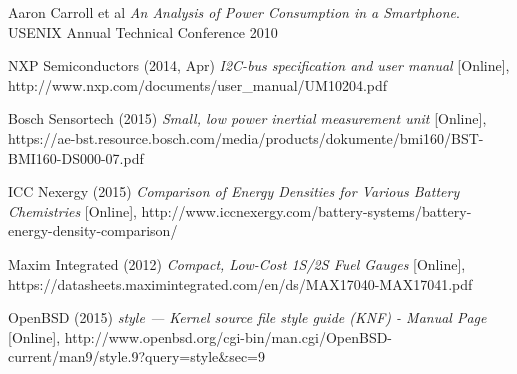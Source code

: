 \documentclass[12pt,openany,a4paper]{book}
\begin{document}
\begin{thebibliography}{99}
	Aaron Carroll et al \emph{An Analysis of Power Consumption in a Smartphone}.
	USENIX Annual Technical Conference 2010
	
	NXP Semiconductors (2014, Apr)
	\emph{I2C-bus specification and user manual} [Online],
	http://www.nxp.com/documents/user\_manual/UM10204.pdf
	
	Bosch Sensortech (2015)
	\emph{Small, low power inertial measurement unit} [Online], https://ae-bst.resource.bosch.com/media/products/dokumente/bmi160/BST-BMI160-DS000-07.pdf
	
	ICC Nexergy (2015)
	\emph{Comparison of Energy Densities for Various Battery Chemistries} [Online], http://www.iccnexergy.com/battery-systems/battery-energy-density-comparison/
	
	Maxim Integrated (2012)
	\emph{Compact, Low-Cost 1S/2S Fuel Gauges} [Online], https://datasheets.maximintegrated.com/en/ds/MAX17040-MAX17041.pdf
	
	OpenBSD (2015)
	\emph{style — Kernel source file style guide (KNF) - Manual Page} [Online], http://www.openbsd.org/cgi-bin/man.cgi/OpenBSD-current/man9/style.9?query=style\&sec=9
	
\end{thebibliography}
\end{document}
